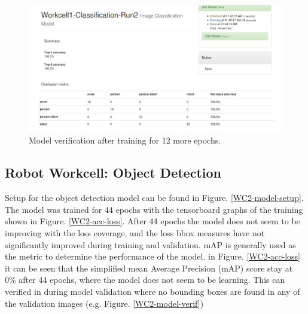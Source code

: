 \documentclass[10pt,journal,compsoc]{IEEEtran}
\begin{document}
\begin{figure}[thpb]
  \centering
  \includegraphics[width=\linewidth]{../img/Workcell1-Classification/Run2/WC1-2-Overfit.png}
  \caption{Model verification after training for 12 more epochs.}
  \label{WC1-verification_2}
\end{figure}


\subsection{Robot Workcell: Object Detection}

Setup for the object detection model can be found in Figure. \ref{WC2-model-setup}. The model was trained for 44 epochs with the tensorboard graphs of the training shown in Figure. \ref{WC2-acc-loss}. After 44 epochs the model does not seem to be improving with the loss coverage, and the loss bbox measures have not significantly improved during training and validation. mAP is generally used as the metric to determine the performance of the model. in Figure. \ref{WC2-acc-loss} it can be seen that the simplified mean Average Precision (mAP) score stay at 0\% after 44 epochs, where the model does not seem to be learning. This can verified in during model validation where no bounding boxes are found in any of the validation images (e.g. Figure. \ref{WC2-model-verif})
\end{document}
